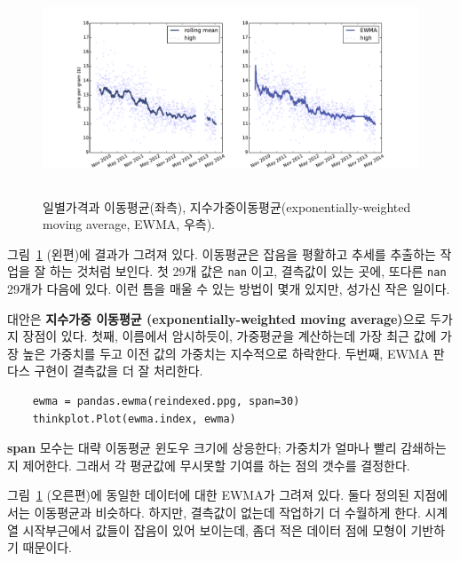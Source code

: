 \begin{figure}
\centerline{\includegraphics[height=2.5in]{figs/timeseries10.pdf}}
\caption{일별가격과 이동평균(좌측), 지수가중이동평균(exponentially-weighted moving average, EWMA, 우측).}
\label{timeseries10}
\end{figure}

그림~\ref{timeseries10} (왼편)에 결과가 그려져 있다.
이동평균은 잡음을 평활하고 추세를 추출하는 작업을 잘 하는 것처럼 보인다. 
첫 29개 값은 {\tt nan} 이고, 결측값이 있는 곳에, 또다른 {\tt nan} 29개가 다음에 있다. 이런 틈을 매울 수 있는 방법이 몇개 있지만, 성가신 작은 일이다.

대안은 {\bf 지수가중 이동평균 (exponentially-weighted moving average)}으로 두가지 장점이 있다. 첫째, 이름에서 암시하듯이, 가중평균을 계산하는데 가장 최근 값에 가장 높은 가중치를 두고 이전 값의 가중치는 지수적으로 하락한다. 두번째, EWMA 판다스 구현이 결측값을 더 잘 처리한다.

\begin{verbatim}
    ewma = pandas.ewma(reindexed.ppg, span=30)
    thinkplot.Plot(ewma.index, ewma)
\end{verbatim}

{\bf span} 모수는 대략 이동평균 윈도우 크기에 상응한다; 가중치가 얼마나 빨리 감쇄하는지 제어한다. 그래서 각 평균값에 무시못할 기여를 하는 점의 갯수를 결정한다.

그림~\ref{timeseries10} (오른편)에 동일한 데이터에 대한 EWMA가 그려져 있다. 둘다 정의된 지점에서는 이동평균과 비슷하다. 하지만, 결측값이 없는데 작업하기 더 수월하게 한다. 시계열 시작부근에서 값들이 잡음이 있어 보이는데, 좀더 적은 데이터 점에 모형이 기반하기 때문이다.


